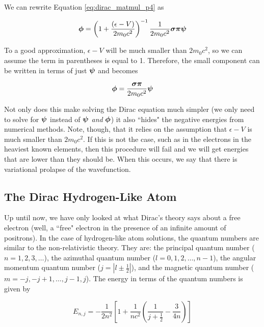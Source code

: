 We can rewrite Equation \ref{eq:dirac_matmul_p4} as

\begin{equation}
\label{eq:dirac_small_comp}
{\bf{\phi}} = \left(1 + \frac{(\epsilon - V)}{2m_{0}c^{2}}\right)^{-1}\frac{1}{2m_{0}c^{2}}{\bf{\sigma\pi}}{\bf{\psi}}
\end{equation}

To a good approximation, $\epsilon - V$ will be much smaller than $2m_{0}c^{2}$, so we can assume the term in parentheses is equal to 1. Therefore, the small component can be written in terms of just ${\bf{\psi}}$ and becomes

\begin{equation}
\label{eq:dirac_small_comp_simp}
{\bf{\phi}} = \frac{{\bf{\sigma\pi}}}{2m_{0}c^{2}}{\bf{\psi}}
\end{equation}

Not only does this make solving the Dirac equation much simpler (we only need to solve for ${\bf{\psi}}$ instead of ${\bf{\psi}}$ \textit{and} ${\bf{\phi}}$) it also ``hides" the negative energies from numerical methods. Note, though, that it relies on the assumption that $\epsilon - V$ is much smaller than $2m_{0}c^{2}$. If this is not the case, such as in the electrons in the heaviest known elements, then this procedure will fail and we will get energies that are lower than they should be. When this occurs, we say that there is variational prolapse of the wavefunction.

\subsection{The Dirac Hydrogen-Like Atom}
Up until now, we have only looked at what Dirac's theory says about a free electron (well, a ``free" electron in the presence of an infinite amount of positrons). In the case of hydrogen-like atom solutions, the quantum numbers are similar to the non-relativistic theory. They are: the principal quantum number ($n=1,2,3,\ldots$), the azimuthal quantum number ($l = 0, 1, 2, \ldots, n-1$), the angular momentum quantum number ($j = | l \pm \frac{1}{2}|$), and the magnetic quantum number ($m = -j,-j+1, \ldots, j-1, j$). The energy in terms of the quantum numbers is given by\cite{Piela}

\begin{equation}
\label{eq:dirac_energy}
E_{n, j} = -\frac{1}{2n^{2}}\left[1+\frac{1}{nc^{2}}\left(\frac{1}{j+\frac{1}{2}}-\frac{3}{4n}\right)\right]
\end{equation}

